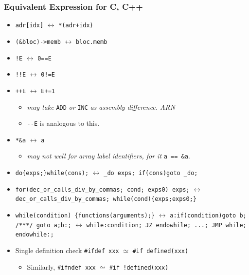 

\subsubsection{Equivalent Expression for C, C++}

\begin{itemize}

\item \verb|adr[idx]| $\leftrightarrow$ \verb|*(adr+idx)|
\item \verb|(&bloc)->memb| $\leftrightarrow$ \verb|bloc.memb|
\item \verb|!E| $\leftrightarrow$ \verb|0==E|
\item \verb|!!E| $\leftrightarrow$ \verb|0!=E|
\item \verb|++E| $\leftrightarrow$ \verb|E+=1|
\begin{itemize}

\item \textit{may take} \verb|ADD| \textit{or} \verb|INC| \textit{as assembly difference. \textemdash{} ARN}
\item \verb|--E| is analogous to this.
\end{itemize}

\item \verb|*&a| $\leftrightarrow$ \verb|a|
\begin{itemize}

\item \textit{may not well for array label identifiers, for it} \verb|a == &a|.
\end{itemize}

\item \verb|do{exps;}while(cons);| $\leftrightarrow$ \verb|_do exps; if(cons)goto _do;|
\item \verb|for(dec_or_calls_div_by_commas; cond; exps0) exps;| $\leftrightarrow$ \verb|dec_or_calls_div_by_commas; while(cond){exps;exps0;}|
\item \verb|while(condition) {functions(arguments);}| $\leftrightarrow$ \verb|a:if(condition)goto b; /***/ goto a;b:;| $\leftrightarrow$ \verb|while:condition; JZ endowhile; ...; JMP while; endowhile:;|
\item Single definition check \verb|#ifdef xxx| $\simeq$ \verb|#if defined(xxx)|
\begin{itemize}

\item Similarly, \verb|#ifndef xxx| $\simeq$ \verb|#if !defined(xxx)|
\end{itemize}


\end{itemize}
